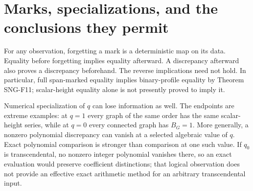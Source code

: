 \documentclass[
  11pt,
  a4paper,
]{report}
\begin{document}
\hypertarget{marks-specializations-and-the-conclusions-they-permit}{%
\section{Marks, specializations, and the conclusions they
permit}\label{marks-specializations-and-the-conclusions-they-permit}}

For any observation, forgetting a mark is a deterministic map on its
data. Equality before forgetting implies equality afterward. A
discrepancy afterward also proves a discrepancy beforehand. The reverse
implications need not hold. In particular, full span-marked equality
implies binary-profile equality by Theorem SNG-F11; scalar-height
equality alone is not presently proved to imply it.

Numerical specialization of \(q\) can lose information as well. The
endpoints are extreme examples: at \(q=1\) every graph of the same order
has the same scalar-height series, while at \(q=0\) every connected
graph has \(B_G=1\). More generally, a nonzero polynomial discrepancy
can vanish at a selected algebraic value of \(q\). Exact polynomial
comparison is stronger than comparison at one such value. If \(q_0\) is
transcendental, no nonzero integer polynomial vanishes there, so an
exact evaluation would preserve coefficient distinctions; that logical
observation does not provide an effective exact arithmetic method for an
arbitrary transcendental input.
\end{document}
